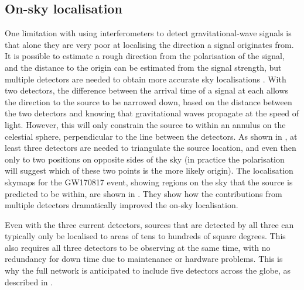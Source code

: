 \subsection{On-sky localisation}
\label{sec:gw_localisation}
\begin{colsection}

One limitation with using interferometers to detect gravitational-wave signals is that alone they are very poor at localising the direction a signal originates from. It is possible to estimate a rough direction from the polarisation of the signal, and the distance to the origin can be estimated from the signal strength, but multiple detectors are needed to obtain more accurate sky localisations \citep{GW_localisation, GW_localisation2}. With two detectors, the difference between the arrival time of a signal at each allows the direction to the source to be narrowed down, based on the distance between the two detectors and knowing that gravitational waves propagate at the speed of light. However, this will only constrain the source to within an annulus on the celestial sphere, perpendicular to the line between the detectors. As shown in , at least three detectors are needed to triangulate the source location, and even then only to two positions on opposite sides of the sky (in practice the polarisation will suggest which of these two points is the more likely origin). The localisation skymaps for the GW170817 event, showing regions on the sky that the source is predicted to be within, are shown in . They show how the contributions from multiple detectors dramatically improved the on-sky localisation.

Even with the three current detectors, sources that are detected by all three can typically only be localised to areas of tens to hundreds of square degrees. This also requires all three detectors to be observing at the same time, with no redundancy for down time due to maintenance or hardware problems. This is why the full network is anticipated to include five detectors across the globe, as described in .


\end{colsection}
